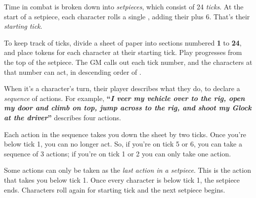 
Time in combat is broken down into \emph{setpieces}, which consist of 24 \emph{ticks}. At the start of a setpiece, each character rolls a single , adding their  plus 6. That's their \emph{starting tick}.

To keep track of ticks, divide a sheet of paper into sections numbered \textbf{1} to \textbf{24}, and place tokens for each character at their starting tick. Play progresses from the top of the setpiece. The GM calls out each tick number, and the characters at that number can act, in descending order of .

When it's a character's turn, their player describes what they do, to declare a \emph{sequence} of actions. For example, \textbf{``\emph{I veer my vehicle over to the rig, open my door and climb on top, jump across to the rig, and shoot my Glock at the driver}''} describes four actions.

Each action in the sequence takes you down the sheet by two ticks. Once you're below tick 1, you can no longer act. So, if you're on tick 5 or 6, you can take a sequence of 3 actions; if you're on tick 1 or 2 you can only take one action.

Some actions can only be taken as the \emph{last action in a setpiece}. This is the action that takes you below tick 1. Once every character is below tick 1, the setpiece ends. Characters roll again for starting tick and the next setpiece begins.
